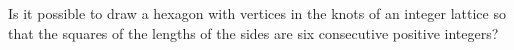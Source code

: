 Is it possible to draw a hexagon with vertices in the knots of an integer lattice so that the squares of the lengths of the sides are six consecutive positive integers?